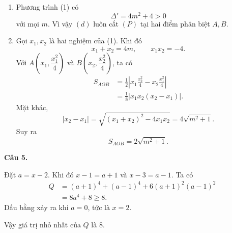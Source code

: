 \documentclass[12pt,a4paper]{article}
\begin{document}
\begin{enumerate}[label=\alph*)]
  \item Phương trình (1) có
  \[
  \Delta'=4m^2+4>0
  \]
  với mọi $m$. Vì vậy $(d)$ luôn cắt $(P)$ tại hai điểm phân biệt $A,B$.

  \item Gọi $x_1,x_2$ là hai nghiệm của (1). Khi đó
  \[
  x_1+x_2=4m,\qquad x_1x_2=-4.
  \]
  Với $A\left(x_1,\dfrac{x_1^2}{4}\right)$ và
  $B\left(x_2,\dfrac{x_2^2}{4}\right)$, ta có
  \begin{align*}
  S_{AOB}
  &=\frac12\left|x_1\frac{x_2^2}{4}-x_2\frac{x_1^2}{4}\right|\\
  &=\frac18\left|x_1x_2(x_2-x_1)\right|.
  \end{align*}
  Mặt khác,
  \[
  |x_2-x_1|
  =\sqrt{(x_1+x_2)^2-4x_1x_2}
  =4\sqrt{m^2+1}.
  \]
  Suy ra
  \[
  \boxed{S_{AOB}=2\sqrt{m^2+1}}.
  \]
\end{enumerate}

\textbf{Câu 5.}

Đặt $a=x-2$. Khi đó $x-1=a+1$ và $x-3=a-1$. Ta có
\begin{align*}
Q&=(a+1)^4+(a-1)^4+6(a+1)^2(a-1)^2\\
 &=8a^4+8\ge 8.
\end{align*}
Dấu bằng xảy ra khi $a=0$, tức là $x=2$.

Vậy giá trị nhỏ nhất của $Q$ là $\boxed{8}$.
\end{document}
